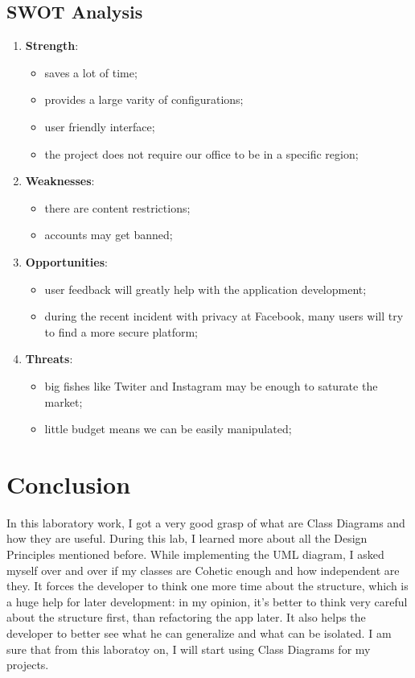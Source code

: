 \documentclass{article}
\begin{document}
	\begin{samepage}
	\section{SWOT Analysis}
		\begin{enumerate}
			\item \textbf{Strength}:
				\begin{itemize}
					\item saves a lot of time;
					\item provides a large varity of configurations;
					\item user friendly interface;
					\item the project does not require our office to be in a specific region;
				\end{itemize}

			\item \textbf{Weaknesses}:
				\begin{itemize}
					\item there are content restrictions;
					\item accounts may get banned;
				\end{itemize}

			\item \textbf{Opportunities}:
				\begin{itemize}
					\item user feedback will greatly help with the application development;
					\item during the recent incident with privacy at Facebook, many users will try to find a more secure platform;
				\end{itemize}

			\item \textbf{Threats}:
				\begin{itemize}
					\item big fishes like Twiter and Instagram may be enough to saturate the market;
					\item little budget means we can be easily manipulated;
				\end{itemize}
		\end{enumerate}
	\end{samepage}

	\section{Conclusion}
		In this laboratory work, I got a very good grasp of what are Class Diagrams and how they are useful. During this lab, I learned more about all the Design Principles mentioned before. While implementing the UML diagram, I asked myself over and over if my classes are Cohetic enough and how independent are they. It forces the developer to think one more time about the structure, which is a huge help for later development: in my opinion, it's better to think very careful about the structure first, than refactoring the app later. It also helps the developer to better see what he can generalize and what can be isolated. I am sure that from this laboratoy on, I will start using Class Diagrams for my projects.
\end{document}
